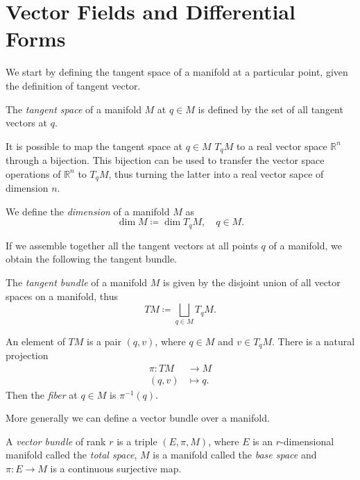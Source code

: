 \section{Vector Fields and Differential Forms}
\label{sec:sec1}

We start by defining the tangent space of a manifold at a particular point, given the definition of tangent vector.

\begin{definition}
    The \emph{tangent space} of a manifold $M$ at $q \in M$ is defined by the set of all tangent vectors at $q$.
\end{definition}

It is possible to map the tangent space at $q \in M$ $T_q M$ to a real vector space $\mathbb{R}^n$ through a bijection.
This bijection can be used to transfer the vector space operations of $\mathbb{R}^n$ to $T_q M$, thus turning the latter into a real vector sapce of dimension $n$.

\begin{definition}
    We define the \emph{dimension} of a manifold $M$ as
    \begin{equation*}
        \dim M \coloneqq \dim T_q M , \quad q \in M .
    \end{equation*}
\end{definition}

If we assemble together all the tangent vectors at all points $q$ of a manifold, we obtain the following the tangent bundle.

\begin{definition}
    The \emph{tangent bundle} of a manifold $M$ is given by the disjoint union of all vector spaces on a manifold, thus
    \begin{equation*}
        TM \coloneqq \bigsqcup _{q \in M} T_q M .
    \end{equation*}
\end{definition}

An element of $TM$ is a pair $(q, v)$, where $q \in M$ and $v \in T_q M$.
There is a natural projection
\begin{align*}
    \pi : TM &\rightarrow M \\
    (q, v) &\mapsto q .
\end{align*}
Then the \emph{fiber} at $q \in M$ is $\pi ^{-1} (q)$.

More generally we can define a vector bundle over a manifold.

\begin{definition}
    A \emph{vector bundle} of rank $r$ is a triple $(E, \pi, M)$, where $E$ is an $r$-dimensional manifold called the \emph{total space}, $M$ is a manifold called the \emph{base space} and $\pi : E \rightarrow M$ is a continuous surjective map.
\end{definition}

